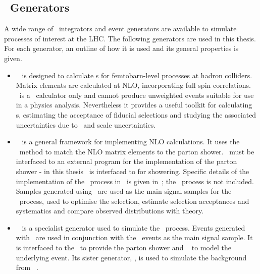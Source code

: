 \subsection{\mc\ Generators}
\label{sec:Theory-MC-gen}

A wide range of \mc\ integrators and event generators are available to simulate
processes of interest at the LHC. The
following generators are used in this thesis. For each generator, an outline of
how it is used and its general properties is given.

\begin{itemize}
    \item \mcfm ~\cite{Campbell:2011} is designed to calculate \cx s for
    femtobarn-level processes at hadron colliders. Matrix elements are
    calculated at NLO, incorporating full spin correlations. \mcfm\ is a \cx\
    calculator only and cannot produce unweighted events suitable for use in a
    physics analysis. Nevertheless it provides a useful toolkit for calculating
    \cx s, estimating the acceptance of fiducial selections and studying the
    associated uncertainties due to \partDF\ and scale uncertainties.

    \item \powhegbox~\cite{Alioli:2010xd} is a general framework for implementing
    NLO calculations. It uses the \powheg\ method to match the NLO matrix
    elements to the parton shower. \powhegbox\ must be interfaced to an external
    program for the implementation of the parton shower - in this thesis
    \powhegbox\ is interfaced to \pythia for showering. Specific details of the
    implementation of the \ZZ\ process in \powhegbox\ is given
    in~\cite{Melia:2011tj}; the \ggZZ\ process is not included. 
    Samples generated using \powhegbox\ are used as the main signal samples for
    the \qqZZ\ process, used to optimise the selection, estimate selection
    acceptances and systematics and compare observed distributions with theory.

    \item \ggtwoZZ~\cite{gg2ZZ} is a specialist generator used to simulate the
    \ggZZ\ process. Events generated with \ggtwoZZ\ are used in conjunction with
    the \powhegbox\ events as the main signal sample. It is interfaced to the
    \herwig\ to provide the parton shower and \jimmy~\cite{bib:jimmy} to model the underlying
    event. Its sister generator, \ggtwoWW, is used to simulate the background
    from \ggWW~\cite{Binoth:2006mf}.


\end{itemize}
